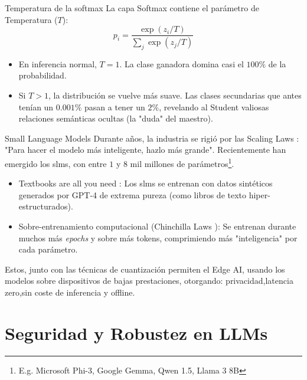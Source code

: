 \begin{frame}{Temperatura de la softmax}
La capa \alert{Softmax} contiene el parámetro de \alert{Temperatura ($T$)}:
\begin{equation}
p_i = \frac{\exp(z_i / T)}{\sum_j \exp(z_j / T)}
\end{equation}

\begin{itemize}
    \item En inferencia normal, $T=1$. La clase ganadora domina casi el $100\%$ de la probabilidad.
    \item Si $T > 1$, la distribución se vuelve \alert{más suave}. Las clases secundarias que antes tenían un $0.001\%$ pasan a tener un $2\%$, revelando al Student valiosas relaciones semánticas ocultas (la "duda" del maestro).
\end{itemize}
\end{frame}

\begin{frame}{Small Language Models}
Durante años, la industria se rigió por las \alert{Scaling Laws} \cite{kaplan2020scaling}: "Para hacer el modelo más inteligente, hazlo más grande". 
Recientemente han emergido los \alert{\glspl{slm}}, con entre $1$ y $8$ mil millones de parámetros\footnote{E.g. Microsoft Phi-3, Google Gemma, Qwen 1.5, Llama 3 8B}.

\begin{itemize}
    \item \alert{Textbooks are all you need \cite{gunasekar2023textbooks}:} Los \glspl{slm} se entrenan con datos sintéticos generados por GPT-4 de extrema pureza (como libros de texto hiper-estructurados).
    \item \alert{Sobre-entrenamiento computacional (Chinchilla Laws \cite{hoffmann2022training}):} Se entrenan durante muchos más \textit{epochs} y sobre más tokens, comprimiendo más "inteligencia" por cada parámetro.
\end{itemize}

Estos, junto con las técnicas de cuantización permiten el \alert{Edge AI}, usando los modelos sobre \alert{dispositivos de bajas prestaciones}, otorgando: \alert{privacidad},\alert{latencia zero},\alert{sin coste de inferencia} y \alert{offline}.
\end{frame}

\section{Seguridad y Robustez en LLMs}

